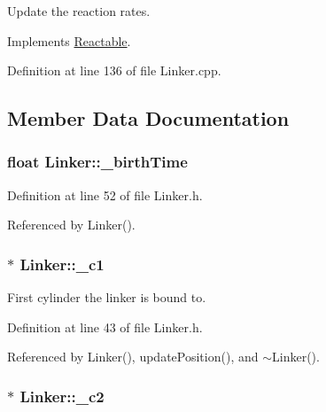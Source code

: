 Update the reaction rates. 



Implements \hyperlink{classReactable_a351e4c2d8891271c46fbbb0103b62619}{Reactable}.



Definition at line 136 of file Linker.\+cpp.



\subsection{Member Data Documentation}
\hypertarget{classLinker_a5bfc4496cdcfd43db3c801349ae16b74}{
\subsubsection[{\+\_\+birth\+Time}]{\setlength{\rightskip}{0pt plus 5cm}float Linker\+::\+\_\+birth\+Time\hspace{0.3cm}{\ttfamily [private]}}}\label{classLinker_a5bfc4496cdcfd43db3c801349ae16b74}


Definition at line 52 of file Linker.\+h.



Referenced by Linker().

\hypertarget{classLinker_ae73f608f5ffd4098f7191de6ba504680}{
\subsubsection[{\+\_\+c1}]{$\ast$ Linker\+::\+\_\+c1\hspace{0.3cm}{\ttfamily [private]}}}\label{classLinker_ae73f608f5ffd4098f7191de6ba504680}


First cylinder the linker is bound to. 



Definition at line 43 of file Linker.\+h.



Referenced by Linker(), update\+Position(), and $\sim$\+Linker().

\hypertarget{classLinker_a60b5cefe855173c410cb4471cd85d14f}{
\subsubsection[{\+\_\+c2}]{$\ast$ Linker\+::\+\_\+c2\hspace{0.3cm}{\ttfamily [private]}}}\label{classLinker_a60b5cefe855173c410cb4471cd85d14f}


